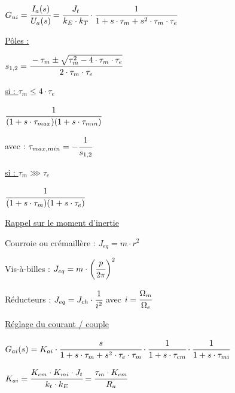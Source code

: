 \documentclass[	DIV=calc,%
							paper=a4,%
							fontsize=10pt,%
							twocolumn]{scrartcl} %
\newcommand{\formtitle}[1]{\large\underline{#1}}
\begin{document}
\vspace{3mm}
{\hfill $G_{ui} = \cfrac{I_a(s)}{U_a(s)} = \cfrac{J_t}{k_E\cdot k_T}\cdot\cfrac{1}{1 + s \cdot \tau_m + s^2 \cdot \tau_m \cdot \tau_e} $\hfill}

\formtitle{Pôles : }

{\hfill $s_{1,2} = \cfrac{-\tau_m \pm \sqrt{\tau_m^2 - 4 \cdot \tau_m \cdot \tau_e}}{2 \cdot \tau_m \cdot \tau_e} $\hfill}

\vspace{3mm}

\formtitle{si :  $\tau_m \leqslant 4 \cdot\tau_e$}

\vspace{3mm}

{\hfill $ \cfrac{1}{(1+s\cdot \tau_{max})(1+s\cdot \tau_{min})}$\hfill}

avec : {\hfill $\tau_{max,min} = -\cfrac{1}{s_{1,2}}$\hfill}

\vspace{3mm}

\formtitle{si : $\tau_m \ggg \tau_e $}

{\hfill $ \cfrac{1}{(1+s\cdot \tau_{m})(1+s\cdot \tau_{e})}$\hfill}

 \newpage

 \formtitle{Rappel sur le moment d’inertie}

 \vspace{3mm}

Courroie ou crémaillère : $J_{eq} = m \cdot r^2$

\vspace{3mm}

Vis-à-billes : $J_{eq} = m \cdot \biggl(\cfrac{p}{2\pi}\biggr)^2$


\vspace{3mm}

Réducteurs : $J_{eq} = J_{ch}\cdot \cfrac{1}{i^2} $ \quad avec $ i = \cfrac{\Omega_m}{\Omega_e}$ 

\vspace{3mm}

\formtitle{Réglage du courant / couple}

\vspace{3mm}

\resizebox{.5\textwidth}{!}
{
    {$G_{ai}(s) = K_{ai} \cdot \cfrac{s}{1+s \cdot \tau_m + s^2 \cdot \tau_e \cdot \tau_m} \cdot \cfrac{1}{1+s \cdot \tau_{cm}}\cdot \cfrac{1}{1+s \cdot \tau_{mi}} $}
}

\vspace{3mm}

{$K_{ai} = \cfrac{K_{cm} \cdot K_{mi} \cdot J_t}{k_t \cdot k_E}  = \cfrac{\tau_m\cdot K_{cm}}{R_a}$}
\end{document}
